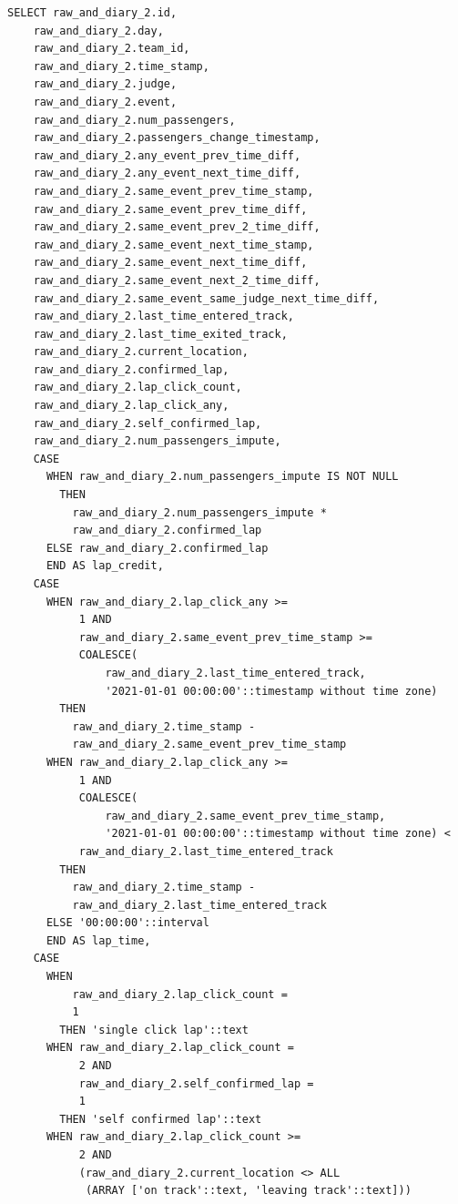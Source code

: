 \documentclass[11pt]{article}
\begin{document}
\begin{lstlisting}[style=sql, caption={Full Audit query}, label={lst:sql_audit_query}]
SELECT raw_and_diary_2.id,
    raw_and_diary_2.day,
    raw_and_diary_2.team_id,
    raw_and_diary_2.time_stamp,
    raw_and_diary_2.judge,
    raw_and_diary_2.event,
    raw_and_diary_2.num_passengers,
    raw_and_diary_2.passengers_change_timestamp,
    raw_and_diary_2.any_event_prev_time_diff,
    raw_and_diary_2.any_event_next_time_diff,
    raw_and_diary_2.same_event_prev_time_stamp,
    raw_and_diary_2.same_event_prev_time_diff,
    raw_and_diary_2.same_event_prev_2_time_diff,
    raw_and_diary_2.same_event_next_time_stamp,
    raw_and_diary_2.same_event_next_time_diff,
    raw_and_diary_2.same_event_next_2_time_diff,
    raw_and_diary_2.same_event_same_judge_next_time_diff,
    raw_and_diary_2.last_time_entered_track,
    raw_and_diary_2.last_time_exited_track,
    raw_and_diary_2.current_location,
    raw_and_diary_2.confirmed_lap,
    raw_and_diary_2.lap_click_count,
    raw_and_diary_2.lap_click_any,
    raw_and_diary_2.self_confirmed_lap,
    raw_and_diary_2.num_passengers_impute,
    CASE
      WHEN raw_and_diary_2.num_passengers_impute IS NOT NULL
        THEN
          raw_and_diary_2.num_passengers_impute *
          raw_and_diary_2.confirmed_lap
      ELSE raw_and_diary_2.confirmed_lap
      END AS lap_credit,
    CASE
      WHEN raw_and_diary_2.lap_click_any >=
           1 AND
           raw_and_diary_2.same_event_prev_time_stamp >=
           COALESCE(
               raw_and_diary_2.last_time_entered_track,
               '2021-01-01 00:00:00'::timestamp without time zone)
        THEN
          raw_and_diary_2.time_stamp -
          raw_and_diary_2.same_event_prev_time_stamp
      WHEN raw_and_diary_2.lap_click_any >=
           1 AND
           COALESCE(
               raw_and_diary_2.same_event_prev_time_stamp,
               '2021-01-01 00:00:00'::timestamp without time zone) <
           raw_and_diary_2.last_time_entered_track
        THEN
          raw_and_diary_2.time_stamp -
          raw_and_diary_2.last_time_entered_track
      ELSE '00:00:00'::interval
      END AS lap_time,
    CASE
      WHEN
          raw_and_diary_2.lap_click_count =
          1
        THEN 'single click lap'::text
      WHEN raw_and_diary_2.lap_click_count =
           2 AND
           raw_and_diary_2.self_confirmed_lap =
           1
        THEN 'self confirmed lap'::text
      WHEN raw_and_diary_2.lap_click_count >=
           2 AND
           (raw_and_diary_2.current_location <> ALL
            (ARRAY ['on track'::text, 'leaving track'::text]))

\end{lstlisting}
\end{document}
